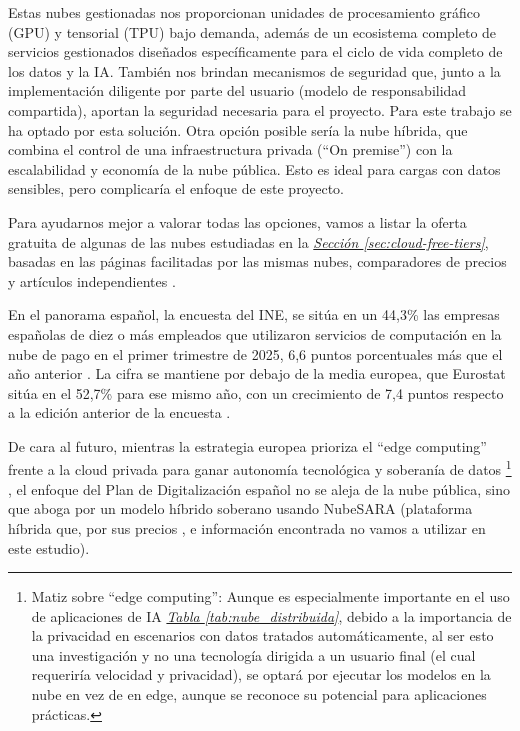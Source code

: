 Estas nubes gestionadas nos proporcionan unidades de procesamiento gráfico (GPU) y tensorial (TPU) bajo demanda, además de un ecosistema completo de servicios gestionados diseñados específicamente para el ciclo de vida completo de los datos y la IA. También nos brindan mecanismos de seguridad que, junto a la implementación diligente por parte del usuario (modelo de responsabilidad compartida), aportan la seguridad necesaria para el proyecto. Para este trabajo se ha optado por esta solución.
Otra opción posible sería la nube híbrida, que combina el control de una infraestructura privada (``On premise'') con la escalabilidad y economía de la nube pública. Esto es ideal para cargas con datos sensibles, pero complicaría el enfoque de este proyecto. 

Para ayudarnos mejor a valorar todas las opciones, vamos a listar la oferta gratuita de algunas de las nubes estudiadas en la \hyperref[sec:cloud-free-tiers]{\textit{Sección \ref*{sec:cloud-free-tiers}}}, basadas en las páginas facilitadas por las mismas nubes, comparadores de precios y artículos independientes \citep{MicrosoftCloudTerminology, lisdorf2021cloud}.

En el panorama español, la encuesta del INE, se sitúa en un 44,3\% las empresas españolas de diez o más empleados que utilizaron servicios de computación en la nube de pago en el primer trimestre de 2025, 6,6 puntos porcentuales más que el año anterior \citep{INE2025TIC}. La cifra se mantiene por debajo de la media europea, que Eurostat sitúa en el 52,7\% para ese mismo año, con un crecimiento de 7,4 puntos respecto a la edición anterior de la encuesta \citep{Eurostat2026Cloud}. 

De cara al futuro, mientras la estrategia europea prioriza el ``edge computing'' frente a la cloud privada para ganar autonomía tecnológica y soberanía de datos \citep{EuroDigitalStrategyEdge} 
\footnote{Matiz sobre ``edge computing'': Aunque es especialmente importante en el uso de aplicaciones de IA  \hyperref[tab:nube_distribuida]{\textit{Tabla \ref*{tab:nube_distribuida}}}, debido a la importancia de la privacidad en escenarios con datos tratados automáticamente, al ser esto una investigación y no una tecnología dirigida a un usuario final (el cual requeriría velocidad y privacidad), se optará por ejecutar los modelos en la nube en vez de en edge, aunque se reconoce su potencial para aplicaciones prácticas.}
, el enfoque del Plan de Digitalización español \citep{GobEspana2021PlanDigitalizacion} no se aleja de la nube pública, sino que aboga por un modelo híbrido soberano usando NubeSARA (plataforma híbrida que, por sus precios \citep{PreciosNubeSARA}, e información encontrada \citep{InfoNubeSARA, InfoPreparaTICNubeSARA} no vamos a utilizar en este estudio).

